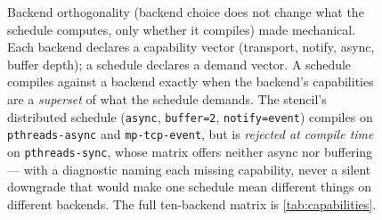 \begin{figure}[tbp]
  \caption[Backend orthogonality as a superset check]{Backend orthogonality
    (backend choice does not change what the schedule computes, only whether it
    compiles) made mechanical. Each backend declares a capability vector
    (transport, notify,
    async, buffer depth); a schedule declares a demand vector. A schedule
    compiles against a backend exactly when the backend's capabilities are a
    \emph{superset} of what the schedule demands. The stencil's distributed
    schedule (\texttt{async}, \texttt{buffer=2}, \texttt{notify=event}) compiles
    on \texttt{pthreads-async} and \texttt{mp-tcp-event}, but is \emph{rejected at
    compile time} on \texttt{pthreads-sync}, whose matrix offers neither async nor
    buffering --- with a diagnostic naming each missing capability, never a silent
    downgrade that would make one schedule mean different things on different
    backends. The full ten-backend matrix is \cref{tab:capabilities}.}
  \label{fig:capability-matrix}
\end{figure}
